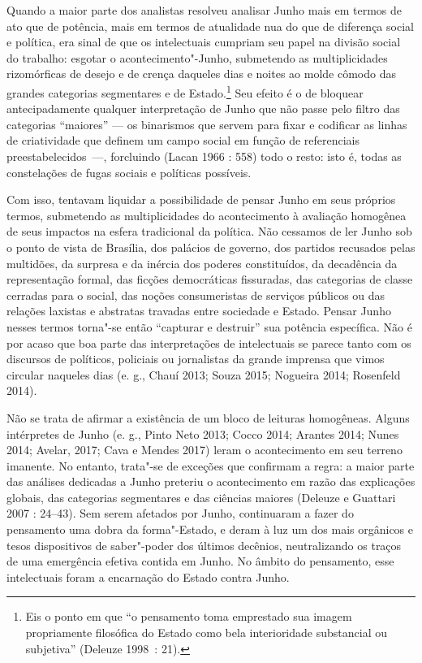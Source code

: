 Quando a maior parte dos analistas
resolveu analisar Junho mais em termos de ato que de potência, mais em
termos de atualidade nua do que de diferença social e política, era
sinal de que os intelectuais cumpriam seu papel na divisão social do
trabalho: esgotar o acontecimento"-Junho, submetendo as multiplicidades
rizomórficas de desejo e de crença daqueles dias e noites ao molde
cômodo das grandes categorias segmentares e de Estado.\footnote{Eis o
  ponto em que ``o pensamento toma emprestado sua imagem
  propriamente filosófica do Estado como bela interioridade substancial
  ou subjetiva'' (Deleuze 1998~: 21).} Seu efeito é o de bloquear
antecipadamente qualquer interpretação de Junho que não passe pelo
filtro das categorias ``maiores'' --- os binarismos que servem para fixar
e codificar as linhas de criatividade que definem um campo social em
função de referenciais preestabelecidos~---, forcluindo (Lacan 1966 :
558) todo o resto: isto é, todas as constelações de fugas sociais e
políticas possíveis.

Com isso, tentavam liquidar a possibilidade de pensar Junho em seus
próprios termos, submetendo as multiplicidades do acontecimento à
avaliação homogênea de seus impactos na esfera tradicional da política.
Não cessamos de ler Junho sob o ponto de vista de Brasília, dos palácios
de governo, dos partidos recusados pelas multidões, da surpresa e da
inércia dos poderes constituídos, da decadência da representação formal,
das ficções democráticas fissuradas, das categorias de classe cerradas
para o social, das noções consumeristas de serviços públicos ou das
relações laxistas e abstratas travadas entre sociedade e Estado. Pensar
Junho nesses termos torna"-se então ``capturar e destruir'' sua potência
específica. Não é por acaso que boa parte das interpretações de
intelectuais se parece tanto com os discursos de políticos, policiais ou
jornalistas da grande imprensa que vimos circular naqueles dias (e. g.,
Chauí 2013; Souza 2015; Nogueira 2014; Rosenfeld 2014).

Não se trata de afirmar a existência de um bloco de leituras homogêneas.
Alguns intérpretes de Junho (e. g., Pinto Neto 2013; Cocco 2014; Arantes 2014;
Nunes 2014; Avelar, 2017; Cava e Mendes 2017) leram o
acontecimento em seu terreno imanente. No entanto, trata"-se de exceções
que confirmam a regra: a maior parte das análises dedicadas a Junho
preteriu o acontecimento em razão das explicações globais, das
categorias segmentares e das ciências maiores (Deleuze e Guattari 2007 :
24--43). Sem serem afetados por Junho, continuaram a fazer do pensamento
uma dobra da forma"-Estado, e deram à luz um dos mais orgânicos e tesos
dispositivos de saber"-poder dos últimos decênios, neutralizando os
traços de uma emergência efetiva contida em Junho. No âmbito do
pensamento, esse intelectuais foram a encarnação do Estado contra Junho.

